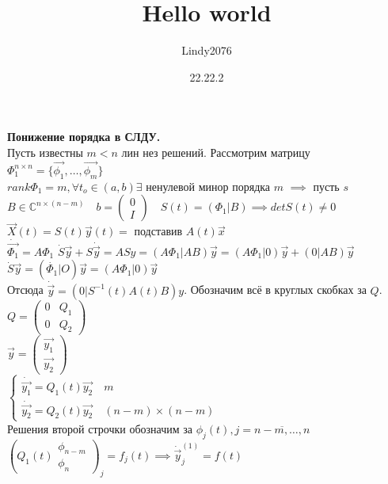\documentclass[12pt, a4paper]{article}
\title{Hello world}
\author{Lindy2076}
\date{22.22.2} %
\begin{document}
    \textbf{Понижение порядка в СЛДУ.}\\
    Пусть известны $m < n$ лин нез решений. Рассмотрим матрицу $\Phi_1^{n \times n} = \{ \vec{\phi_1}, \dotsc, \vec{\phi_m} \}$\\
    $rank \Phi_1 = m, \forall t_o \in (a, b) \exists \text{ ненулевой минор порядка } m$
    $\implies $ пусть $ s$\\

    $B \in \mathbb{C}^{n\times (n-m)} \quad b = 
    \left(\begin{matrix}
        0 \\ I %
    \end{matrix}\right) \quad S(t) = (\Phi_1 | B) \implies det S(t) \neq 0$
    $\vec{X}(t) = S(t) \vec{y}(t) = \text{ подставив } A(t) \vec{x}$\\
    $\dot{\vec{\Phi_1}} = A\Phi_1$
    $\dot{S}\vec{y} + S \dot{\vec{y}} = ASy = (A\Phi_1 | AB)\vec{y} = 
    (A\Phi_1 | 0) \vec{y} + (0|AB)\vec{y}
    $\\
    $\dot{S}\vec{y} = (\dot{\Phi_1} | O)\vec{y} = (A\Phi_1 | 0)\vec{y}$\\
    Отсюда $\dot{\vec{y}}= (0 | S^{-1}(t) A(t)B)y$. Обозначим всё в круглых скобках за $Q$.\\
    $Q = \left(\begin{matrix}
        0 & Q_1\\ 0 & Q_2 %
    \end{matrix}\right)$\\
    $\vec{y} = \left(\begin{matrix}
        \vec{y_1} \\ \vec{y_2}
    \end{matrix}\right)$\\
    $\begin{cases}
        \dot{\vec{y_1}} = Q_1(t) \vec{y_2}\quad m\\
        \dot{\vec{y_2}} = Q_2(t) \vec{y_2}\quad (n-m)\times (n-m)
    \end{cases}$\\
    Решения второй строчки обозначим за $\phi_j(t), j=\overline{n-m, \dotsc, n}$\\
    $(Q_1(t)\begin{matrix}
        \phi_{n-m}\\\phi_n
    \end{matrix})_j = f_j(t) \implies \dot{\vec{y}}_j^{(1)} = f(t)$\\
\end{document}
